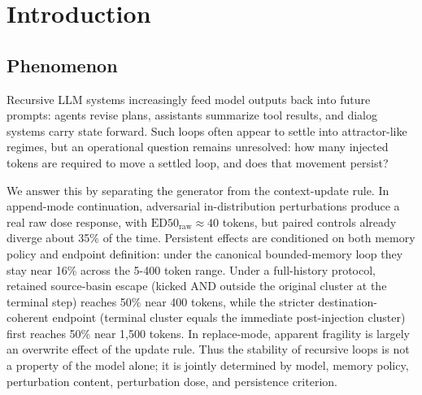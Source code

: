 \documentclass{article}
\theoremstyle{plain}
\theoremstyle{definition}
\begin{document}
\section{Introduction}

\subsection{Phenomenon}

Recursive LLM systems increasingly feed model outputs back into future prompts: agents revise plans, assistants summarize tool results, and dialog systems carry state forward. Such loops often appear to settle into attractor-like regimes, but an operational question remains unresolved: how many injected tokens are required to move a settled loop, and does that movement persist?

We answer this by separating the generator from the context-update rule. In append-mode continuation, adversarial in-distribution perturbations produce a real raw dose response, with $\mathrm{ED50}_{\mathrm{raw}}\approx 40$ tokens, but paired controls already diverge about 35\% of the time. Persistent effects are conditioned on both memory policy and endpoint definition: under the canonical bounded-memory loop they stay near 16\% across the 5-400 token range. Under a full-history protocol, retained source-basin escape (kicked AND outside the original cluster at the terminal step) reaches 50\% near 400 tokens, while the stricter destination-coherent endpoint (terminal cluster equals the immediate post-injection cluster) first reaches 50\% near 1,500 tokens. In replace-mode, apparent fragility is largely an overwrite effect of the update rule. Thus the stability of recursive loops is not a property of the model alone; it is jointly determined by model, memory policy, perturbation content, perturbation dose, and persistence criterion.
\end{document}
